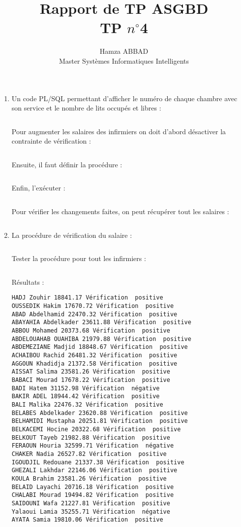 \documentclass[12pt,a4paper]{article}
\author{Hamza ABBAD\\ Master Systèmes Informatiques Intelligents}
\title{\textbf{Rapport de TP ASGBD} \\ TP $n^{\circ}$4}
\begin{document}
\maketitle
\begin{enumerate}
    \item Un code PL/SQL permettant d'afficher le numéro de chaque chambre avec son
    service et le nombre de lits occupés et libres :
    \inputminted[firstline=4, lastline=18]{SQL}{../Scripts/TP4.sql}
    Pour augmenter les salaires des infirmiers on doit d'abord désactiver la contrainte de vérification :
    \inputminted[firstline=21, lastline=21]{SQL}{../Scripts/TP4.sql}
    Ensuite, il faut définir la procédure :
    \inputminted[firstline=22, lastline=29]{SQL}{../Scripts/TP4.sql}
    Enfin, l'exécuter :
    \inputminted[firstline=30, lastline=30]{SQL}{../Scripts/TP4.sql}
    Pour vérifier les changements faites, on peut récupérer tout les salaires :
    \inputminted[firstline=31, lastline=31]{SQL}{../Scripts/TP4.sql}
    \item La procédure de vérification du salaire :
    \inputminted[firstline=34, lastline=40]{SQL}{../Scripts/TP4.sql}
    Tester la procédure pour tout les infirmiers :
    \inputminted[firstline=42, lastline=50]{SQL}{../Scripts/TP4.sql}
    Résultats :
    \begin{oframed}
        \begin{verbatim}
HADJ Zouhir 18841.17 Vérification  positive
OUSSEDIK Hakim 17670.72 Vérification  positive
ABAD Abdelhamid 22470.32 Vérification  positive
ABAYAHIA Abdelkader 23611.88 Vérification  positive
ABBOU Mohamed 20373.68 Vérification  positive
ABDELOUAHAB OUAHIBA 21979.88 Vérification  positive
ABDEMEZIANE Madjid 18848.67 Vérification  positive
ACHAIBOU Rachid 26481.32 Vérification  positive
AGGOUN Khadidja 21372.58 Vérification  positive
AISSAT Salima 23581.26 Vérification  positive
BABACI Mourad 17678.22 Vérification  positive
BADI Hatem 31152.98 Vérification  négative
BAKIR ADEL 18944.42 Vérification  positive
BALI Malika 22476.32 Vérification  positive
BELABES Abdelkader 23620.88 Vérification  positive
BELHAMIDI Mustapha 20251.81 Vérification  positive
BELKACEMI Hocine 20322.68 Vérification  positive
BELKOUT Tayeb 21982.88 Vérification  positive
FERAOUN Houria 32599.71 Vérification  négative
CHAKER Nadia 26527.82 Vérification  positive
IGOUDJIL Redouane 21337.38 Vérification  positive
GHEZALI Lakhdar 22146.06 Vérification  positive
KOULA Brahim 23581.26 Vérification  positive
BELAID Layachi 20716.18 Vérification  positive
CHALABI Mourad 19494.82 Vérification  positive
SAIDOUNI Wafa 21227.81 Vérification  positive
Yalaoui Lamia 35255.71 Vérification  négative
AYATA Samia 19810.06 Vérification  positive


\end{verbatim}
\end{oframed}
\end{enumerate}
\end{document}
